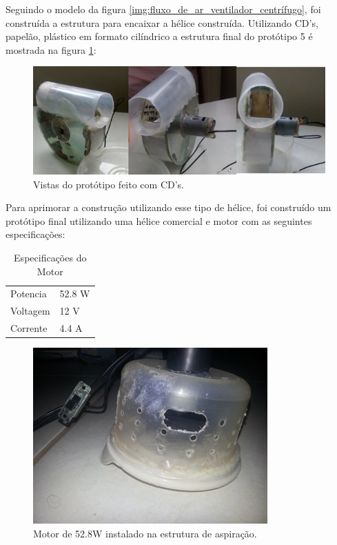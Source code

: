 		Seguindo o modelo da figura \ref{img:fluxo_de_ar_ventilador_centrífugo}, foi construída a estrutura para encaixar a hélice construída. Utilizando CD’s, papelão, plástico em formato cilíndrico a estrutura final do protótipo 5 é mostrada na figura \ref{img:protótipo_CD}: 

		\begin{figure}[H]
			\centering
			\includegraphics[scale=1]{figuras/asppc2_8.jpg}
			\caption{Vistas do protótipo feito com CD’s.}
			\label{img:protótipo_CD}
		\end{figure}

		Para aprimorar a construção utilizando esse tipo de hélice, foi construído um protótipo final utilizando uma hélice comercial e motor com as seguintes especificações:

		\begin{table}[]
			\centering
			\caption{Especificações do Motor}
			\label{tab:specsmotor}
			\begin{tabular}{ll}
				Potencia   & 52.8 W          \\
				Voltagem   & 12 V          \\
				Corrente     & 4.4 A     
			\end{tabular}
		\end{table}

		\begin{figure}[H]
			\centering
			\includegraphics[scale=1]{figuras/asppc2_9.jpg}
			\caption{Motor de 52.8W instalado na estrutura de aspiração.}
			\label{img:estrutura_motor_52.8W}
		\end{figure}

